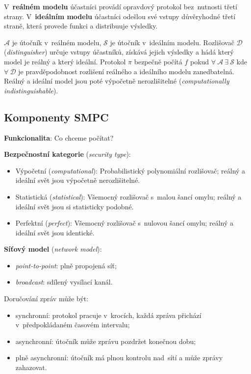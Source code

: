 V~\textbf{reálném modelu} účastníci provádí opravdový protokol bez~nutnosti třetí strany.
V~\textbf{ideálním modelu} účastníci odešlou své vstupy důvěryhodné třetí straně, která provede funkci a distribuuje výsledky.

$\mathcal{A}$ je útočník v~reálném modelu, $\mathcal{S}$ je útočník v~ideálním modelu.
Rozlišovač $\mathcal{D}$ (\emph{distinguisher}) určuje vstupy účastníků, získává jejich výsledky a hádá který model je reálný a který ideální.
Protokol $\pi$ bezpečně počítá $f$ pokud $\forall \ \mathcal{A} \ \exists \ \mathcal{S}$ kde $\forall \ \mathcal{D}$ je pravděpodobnost rozlišení reálného a ideálního modelu zanedbatelná.
Reálný a ideální model jsou poté výpočetně nerozlišitelné (\emph{computationally indistinguishable}).

\subsection{Komponenty SMPC}

\textbf{Funkcionalita}: Co chceme počítat?

\textbf{Bezpečnostní kategorie} (\emph{security type}):

\begin{itemize}
\item Výpočetní (\emph{computational}): Probabilistický polynomiální rozlišovač; reálný a ideální svět jsou výpočetně nerozlišitelné.
\item Statistická (\emph{statistical}): Všemocný rozlišovač s~malou šancí omylu; reálný a ideální svět jsou si statisticky podobné.
\item Perfektní (\emph{perfect}): Všemocný rozlišovač s~nulovou šancí omylu; reálný a ideální svět jsou identické.
\end{itemize}

\textbf{Síťový model} (\emph{network model}):

\begin{itemize}
\item \emph{point-to-point}: plně propojená síť;
\item \emph{broadcast}: sdílený vysílací kanál.
\end{itemize}

Doručování zpráv může být:
\begin{itemize}
\item synchronní: protokol pracuje v~krocích, každá zpráva přichází v~předpokládaném časovém intervalu;
\item asynchronní: útočník může zprávu pozdržet konečnou dobu;
\item plně asynchronní: útočník má plnou kontrolu nad~sítí a může zprávy zahazovat.
\end{itemize}

